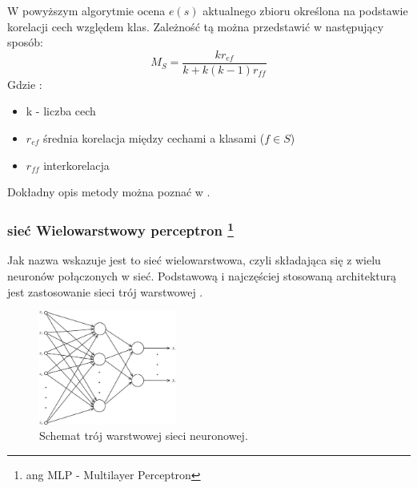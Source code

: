 \documentclass{classrep}
\begin{document}
W powyższym algorytmie ocena $e(s)$ aktualnego zbioru określona na podstawie korelacji cech względem klas. Zależność tą można przedstawić w następujący sposób:
\begin{equation}
M_{S} = \frac{k r_{ef} }{k + k(k-1)r_{ff} }
\end{equation}
Gdzie :
\begin{itemize}
\item k - liczba cech
\item $r_{ef}$ średnia korelacja między cechami a klasami ($f \in S$)
\item $r_{ff}$ interkorelacja
\end{itemize}
Dokładny opis metody można poznać w \cite{Hall1998}.


\subsubsection{sieć Wielowarstwowy perceptron \footnote{ang MLP - Multilayer Perceptron}}
\label{MLP}

Jak nazwa wskazuje jest to sieć wielowarstwowa, czyli składająca się z wielu neuronów połączonych w sieć. Podstawową i najczęściej stosowaną architekturą jest zastosowanie sieci trój warstwowej .

\begin{figure}[H]
\centering
\includegraphics[width=0.4\textwidth]{arch_jw}
  \caption{Schemat trój warstwowej  sieci neuronowej.}
  \label{MLParch}
\end{figure}
\end{document}
